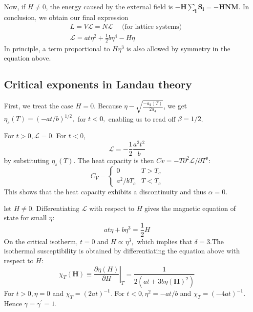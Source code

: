 \documentclass[12pt,titlepage]{article}
\numberwithin{equation}{section}
\begin{document}
Now, if $H \neq 0$, the energy caused by the external field is $-\boldsymbol{H} \sum_{\boldsymbol{i}} \boldsymbol{S}_{\boldsymbol{i}}=-\boldsymbol{H} \boldsymbol{N} \boldsymbol{M}$. In conclusion, we obtain our final expression
\begin{equation}
\begin{array}{l}{L=V \mathcal{L}=N \mathcal{L} \quad \text { (for lattice systems) }} \\ {\mathcal{L}=a t \eta^{2}+\frac{1}{2} b \eta^{4}-H \eta}\end{array}
\end{equation}
In principle, a term proportional to $H\eta^3$ is also allowed by symmetry in the equation above.
\subsection{Critical exponents in Landau theory}
First, we treat the case $H=0$. Because $\eta-\sqrt{\frac{-a_{2}(T)}{2 a_{4}}}$, we get $\eta_{s}(T)=(-a t / b)^{1 / 2},$ for $t<0,$ enabling us to read off $\beta=1 / 2$.

For $t>0, \mathcal{L}=0$. For $t<0$,
\begin{equation}
\mathcal{L}=-\frac{1}{2} \frac{a^{2} t^{2}}{b}
\end{equation}
by substituting $\eta_s(T)$. The heat capacity is then $C v=-T \partial^{2} \mathcal{L} / \partial T^{2}$:
\begin{equation}
C_{V}=\left\{\begin{array}{ll}{0} & {T>T_{c}} \\ {a^{2} / b T_{c}} & {T<T_{c}}\end{array}\right.
\end{equation}
This shows that the heat capacity exhibits a discontinuity and thus $\alpha=0$.

let $H \neq 0 .$ Differentiating $\mathcal{L}$ with respect to $H$ gives the magnetic equation of state for small $\eta :$
\begin{equation}
a t \eta+b \eta^{3}=\frac{1}{2} H
\end{equation}
On the critical isotherm, $t=0$ and $H \propto \eta^{3},$ which implies that $\delta=3$.The isothermal susceptibility is obtained
by differentiating the equation above with respect to $H$:
\begin{equation}
\left.\chi_{T}(\boldsymbol{H}) \equiv \frac{\partial \eta(H)}{\partial H}\right|_{T}=\frac{1}{2\left(a t+3 b \eta(\boldsymbol{H})^{2}\right)}
\end{equation}
For $t>0, \eta=0$ and $\chi_{T}=(2 a t)^{-1}$. For $t<0, \eta^{2}=-a t / b$ and $\chi_{T}=(-4 a t)^{-1} .$ Hence $\gamma=\gamma^{\prime}=1$.
\end{document}
